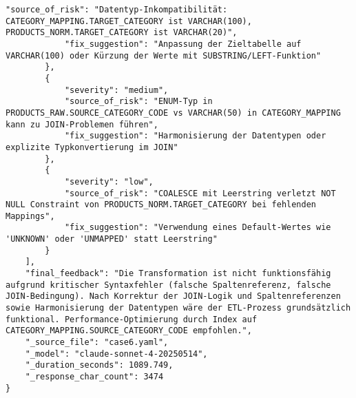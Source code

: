 \begin{lstlisting}[caption={Ausgabe: Claude Sonnet 4 Anwendungsfall 6 Hauptdurchlauf},label={claude_case6_prompt1}]
            "source_of_risk": "Datentyp-Inkompatibilität: CATEGORY_MAPPING.TARGET_CATEGORY ist VARCHAR(100), PRODUCTS_NORM.TARGET_CATEGORY ist VARCHAR(20)",
            "fix_suggestion": "Anpassung der Zieltabelle auf VARCHAR(100) oder Kürzung der Werte mit SUBSTRING/LEFT-Funktion"
        },
        {
            "severity": "medium",
            "source_of_risk": "ENUM-Typ in PRODUCTS_RAW.SOURCE_CATEGORY_CODE vs VARCHAR(50) in CATEGORY_MAPPING kann zu JOIN-Problemen führen",
            "fix_suggestion": "Harmonisierung der Datentypen oder explizite Typkonvertierung im JOIN"
        },
        {
            "severity": "low",
            "source_of_risk": "COALESCE mit Leerstring verletzt NOT NULL Constraint von PRODUCTS_NORM.TARGET_CATEGORY bei fehlenden Mappings",
            "fix_suggestion": "Verwendung eines Default-Wertes wie 'UNKNOWN' oder 'UNMAPPED' statt Leerstring"
        }
    ],
    "final_feedback": "Die Transformation ist nicht funktionsfähig aufgrund kritischer Syntaxfehler (falsche Spaltenreferenz, falsche JOIN-Bedingung). Nach Korrektur der JOIN-Logik und Spaltenreferenzen sowie Harmonisierung der Datentypen wäre der ETL-Prozess grundsätzlich funktional. Performance-Optimierung durch Index auf CATEGORY_MAPPING.SOURCE_CATEGORY_CODE empfohlen.",
    "_source_file": "case6.yaml",
    "_model": "claude-sonnet-4-20250514",
    "_duration_seconds": 1089.749,
    "_response_char_count": 3474
}
\end{lstlisting}

